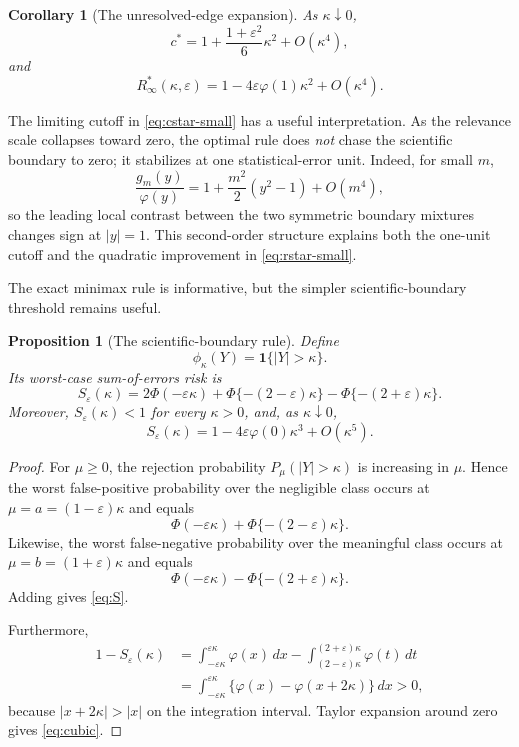 \documentclass[11pt]{article}
\newtheorem{proposition}{Proposition}
\newtheorem{corollary}{Corollary}
\theoremstyle{remark}
\begin{document}
\begin{corollary}[The unresolved-edge expansion]
\label{cor:smallkappa}
As $\kappa\downarrow0$,
\begin{equation}
c^*
=
1+\frac{1+\varepsilon^2}{6}\kappa^2+O(\kappa^4),
\label{eq:cstar-small}
\end{equation}
and
\begin{equation}
R_\infty^*(\kappa,\varepsilon)
=
1-4\varepsilon\varphi(1)\kappa^2+O(\kappa^4).
\label{eq:rstar-small}
\end{equation}
\end{corollary}

The limiting cutoff in \eqref{eq:cstar-small} has a useful interpretation. As the relevance scale collapses toward zero, the optimal rule does \emph{not} chase the scientific boundary to zero; it stabilizes at one statistical-error unit. Indeed, for small $m$,
\[
\frac{g_m(y)}{\varphi(y)}
=
1+\frac{m^2}{2}(y^2-1)+O(m^4),
\]
so the leading local contrast between the two symmetric boundary mixtures changes sign at $|y|=1$. This second-order structure explains both the one-unit cutoff and the quadratic improvement in \eqref{eq:rstar-small}.

The exact minimax rule is informative, but the simpler scientific-boundary threshold remains useful.

\begin{proposition}[The scientific-boundary rule]
\label{prop:critical-simple}
Define
\[
\phi_\kappa(Y)=\mathbf1\{|Y|>\kappa\}.
\]
Its worst-case sum-of-errors risk is
\begin{equation}
S_\varepsilon(\kappa)
=
2\Phi(-\varepsilon\kappa)
+
\Phi\{-(2-\varepsilon)\kappa\}
-
\Phi\{-(2+\varepsilon)\kappa\}.
\label{eq:S}
\end{equation}
Moreover, $S_\varepsilon(\kappa)<1$ for every $\kappa>0$, and, as $\kappa\downarrow0$,
\begin{equation}
S_\varepsilon(\kappa)
=
1-4\varepsilon\varphi(0)\kappa^3+O(\kappa^5).
\label{eq:cubic}
\end{equation}
\end{proposition}

\begin{proof}
For $\mu\ge0$, the rejection probability $P_\mu(|Y|>\kappa)$ is increasing in $\mu$. Hence the worst false-positive probability over the negligible class occurs at $\mu=a=(1-\varepsilon)\kappa$ and equals
\[
\Phi(-\varepsilon\kappa)+\Phi\{-(2-\varepsilon)\kappa\}.
\]
Likewise, the worst false-negative probability over the meaningful class occurs at $\mu=b=(1+\varepsilon)\kappa$ and equals
\[
\Phi(-\varepsilon\kappa)-\Phi\{-(2+\varepsilon)\kappa\}.
\]
Adding gives \eqref{eq:S}.

Furthermore,
\[
\begin{aligned}
1-S_\varepsilon(\kappa)
&=
\int_{-\varepsilon\kappa}^{\varepsilon\kappa}\varphi(x)\,dx
-
\int_{(2-\varepsilon)\kappa}^{(2+\varepsilon)\kappa}\varphi(t)\,dt\\
&=
\int_{-\varepsilon\kappa}^{\varepsilon\kappa}
\{\varphi(x)-\varphi(x+2\kappa)\}\,dx>0,
\end{aligned}
\]
because $|x+2\kappa|>|x|$ on the integration interval. Taylor expansion around zero gives \eqref{eq:cubic}.
\end{proof}
\end{document}
